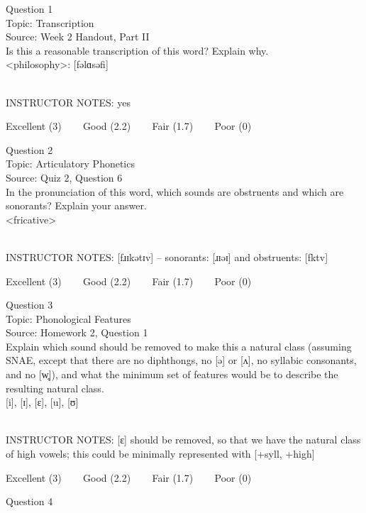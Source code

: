 \documentclass[12pt]{article}
\begin{document}
{\large Question 1}\\

Topic: Transcription\\
Source: Week 2 Handout, Part II\\

Is this a reasonable transcription of this word? Explain why.\\

<philosophy>: {[fəlɑsəfi]}


~\\
INSTRUCTOR NOTES: yes


\vfill
Excellent (3) ~~~ Good (2.2) ~~~ Fair (1.7) ~~~ Poor (0)
\newpage

{\large Question 2}\\

Topic: Articulatory Phonetics\\
Source: Quiz 2, Question 6\\

In the pronunciation of this word, which sounds are obstruents and which are sonorants? Explain your answer.\\

<fricative>


~\\
INSTRUCTOR NOTES: [fɹɪkətɪv] -- sonorants: [ɹɪəɪ] and obstruents: [fktv]


\vfill
Excellent (3) ~~~ Good (2.2) ~~~ Fair (1.7) ~~~ Poor (0)
\newpage

{\large Question 3}\\

Topic: Phonological Features\\
Source: Homework 2, Question 1\\

Explain which sound should be removed to make this a natural class (assuming SNAE, except that there are no diphthongs, no [ə] or [ʌ], no syllabic consonants, and no [w̥]), and what the minimum set of features would be to describe the resulting natural class.\\

{[i]}, {[ɪ]}, {[ɛ]}, {[u]}, {[ʊ]}


~\\
INSTRUCTOR NOTES: [ɛ] should be removed, so that we have the natural class of high vowels; this could be minimally represented with [+syll, +high]


\vfill
Excellent (3) ~~~ Good (2.2) ~~~ Fair (1.7) ~~~ Poor (0)
\newpage

{\large Question 4}\\
\end{document}
